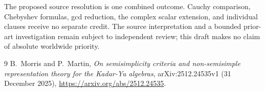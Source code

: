 \documentclass[11pt]{article}
\begin{document}
The proposed source resolution is one combined outcome. Cauchy comparison,
Chebyshev formulas, gcd reduction, the complex scalar extension, and individual
clauses receive no separate credit. The source interpretation and a bounded
prior-art investigation remain subject to independent review; this draft makes
no claim of absolute worldwide priority.

\begin{thebibliography}{9}
 B.~Morris and P.~Martin,
\emph{On semisimplicity criteria and non-semisimple representation theory
for the Kadar-Yu algebras}, arXiv:2512.24535v1 (31 December 2025),
\url{https://arxiv.org/abs/2512.24535}.
\end{thebibliography}
\end{document}
